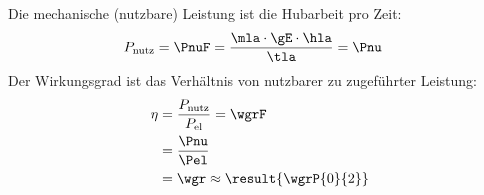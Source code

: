 Die mechanische (nutzbare) Leistung ist die Hubarbeit pro Zeit:
\begin{align}
 P_\mathrm{nutz} &= \PnuF = \frac{\mla\cdot\gE\cdot\hla}{\tla} = \Pnu
\end{align}
Der Wirkungsgrad ist das Verhältnis von nutzbarer zu zugeführter Leistung:
\begin{align}
 \eta &= \frac{P_\mathrm{nutz}}{P_\mathrm{el}} = \wgrF \\
   &= \frac{\Pnu}{\Pel} \\
   &= \wgr \approx \result{\wgrP{0}{2}}
\end{align}
